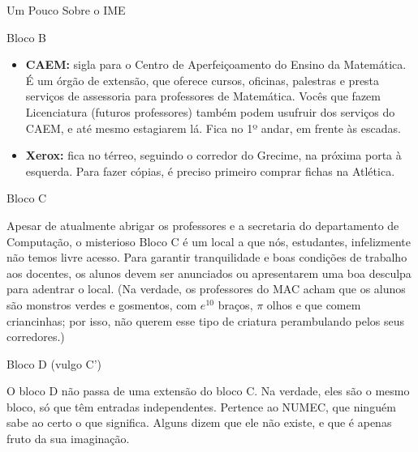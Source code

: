 \begin{secao}{Um Pouco Sobre o IME}
\begin{subsecao}{Bloco B}
\begin{itemize}
A Seção de Alunos fica na sala 12, ao lado do CEC e das mesas azuis.
\begin{itemize}
\item[-] Horário de atendimento: 10:00 às 13:00 e 18:00 às 20:00 de segunda a sexta.
\item[-] E-mail: \tt{saol@ime.usp}
\item[-] Telefone: \tt{11 3091-6149} e \tt{11 3091-6279}
\end{itemize}

\item {\bf CAEM:} sigla para o Centro de Aperfeiçoamento do Ensino da Matemática.
É um órgão de extensão, que oferece cursos, oficinas, palestras e presta serviços
de assessoria para professores de Matemática. Vocês que fazem Licenciatura (futuros 
professores) também podem usufruir dos serviços do CAEM, e até mesmo estagiarem lá. 
Fica no 1º andar, em frente às escadas.

\item{\bf Xerox:} fica no térreo, seguindo o corredor do Grecime, na próxima
                  porta à esquerda. Para fazer cópias, é preciso primeiro
                  comprar fichas na Atlética.
\end{itemize}
\end{subsecao}

\begin{subsecao}{Bloco C}

Apesar de atualmente abrigar os professores e a secretaria do departamento de
Computação, o misterioso Bloco C é um local a que nós, estudantes, infelizmente não
temos livre acesso. Para garantir tranquilidade e boas condições de trabalho aos
docentes, os alunos devem ser anunciados ou apresentarem uma boa desculpa para 
adentrar o local. (Na verdade, os professores do MAC acham que os alunos são monstros
verdes e gosmentos, com $e^{10}$ braços, $\pi$ olhos e que comem criancinhas;
por isso, não querem esse tipo de criatura perambulando pelos seus corredores.)

\end{subsecao}

\begin{subsecao}{Bloco D (vulgo C')}

O bloco D não passa de uma extensão do bloco C. Na verdade, eles são o mesmo bloco,
só que têm entradas independentes. Pertence ao NUMEC, que ninguém sabe ao certo
o que significa. Alguns dizem que ele não existe, e que é apenas fruto da sua
imaginação.

\end{subsecao}


\end{secao}
